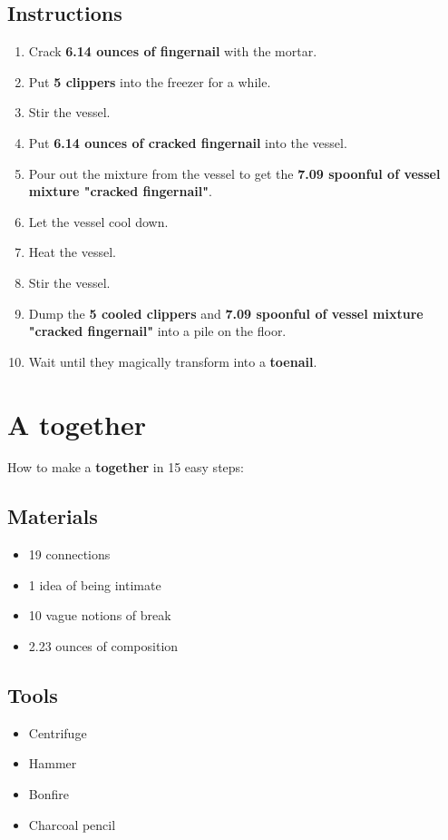 \documentclass{article}
\begin{document}
\subsection{Instructions}\begin{enumerate}
\item 
Crack \textbf{6.14 ounces of fingernail} with the mortar.
\item 
Put \textbf{5 clippers} into the freezer for a while.
\item 
Stir the vessel.
\item 
Put \textbf{6.14 ounces of cracked fingernail} into the vessel.
\item 
Pour out the mixture from the vessel to get the \textbf{7.09 spoonful of vessel mixture "cracked fingernail"}.
\item 
Let the vessel cool down.
\item 
Heat the vessel.
\item 
Stir the vessel.
\item 
Dump the \textbf{5 cooled clippers} and \textbf{7.09 spoonful of vessel mixture "cracked fingernail"} into a pile on the floor.
\item 
Wait until they magically transform into a \textbf{toenail}.
\end{enumerate}
\newpage
\section{A together}How to make a \textbf{together} in 15 easy steps:

\subsection{Materials}\begin{itemize}
\item 
19 connections
\item 
1 idea of being intimate
\item 
10 vague notions of break
\item 
2.23 ounces of composition
\end{itemize}
\subsection{Tools}\begin{itemize}
\item 
Centrifuge
\item 
Hammer
\item 
Bonfire
\item 
Charcoal pencil
\end{itemize}
\end{document}
